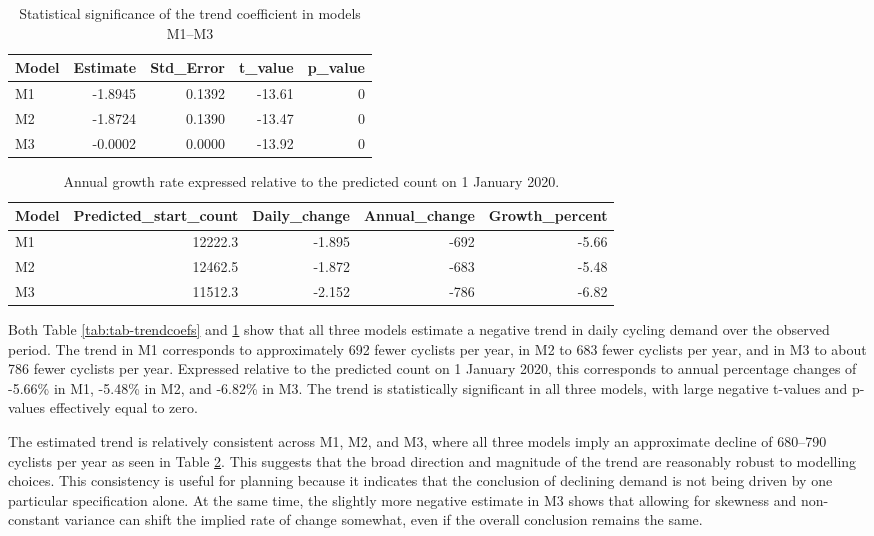 \documentclass[
]{article}
\begin{document}
\begin{table}[!h]
\centering
\caption{\label{tab:tab-trendsig}Statistical significance of the trend coefficient in models M1--M3}
\centering
\begin{tabular}[t]{lrrrr}
\toprule
Model & Estimate & Std\_Error & t\_value & p\_value\\
\midrule
M1 & -1.8945 & 0.1392 & -13.61 & 0\\
M2 & -1.8724 & 0.1390 & -13.47 & 0\\
M3 & -0.0002 & 0.0000 & -13.92 & 0\\
\bottomrule
\end{tabular}
\end{table}

\begin{table}[!h]
\centering
\caption{\label{tab:tab-growthrate}Annual growth rate expressed relative to the predicted count on 1 January 2020.}
\centering
\begin{tabular}[t]{lrrrr}
\toprule
Model & Predicted\_start\_count & Daily\_change & Annual\_change & Growth\_percent\\
\midrule
M1 & 12222.3 & -1.895 & -692 & -5.66\\
M2 & 12462.5 & -1.872 & -683 & -5.48\\
M3 & 11512.3 & -2.152 & -786 & -6.82\\
\bottomrule
\end{tabular}
\end{table}

Both Table \ref{tab:tab-trendcoefs} and \ref{tab:tab-trendsig} show that all three models estimate a negative trend in daily cycling demand over the observed period. The trend in M1 corresponds to approximately 692 fewer cyclists per year, in M2 to 683 fewer cyclists per year, and in M3 to about 786 fewer cyclists per year. Expressed relative to the predicted count on 1 January 2020, this corresponds to annual percentage changes of -5.66\% in M1, -5.48\% in M2, and -6.82\% in M3. The trend is statistically significant in all three models, with large negative t-values and p-values effectively equal to zero.

The estimated trend is relatively consistent across M1, M2, and M3, where all three models imply an approximate decline of 680--790 cyclists per year as seen in Table \ref{tab:tab-growthrate}. This suggests that the broad direction and magnitude of the trend are reasonably robust to modelling choices. This consistency is useful for planning because it indicates that the conclusion of declining demand is not being driven by one particular specification alone. At the same time, the slightly more negative estimate in M3 shows that allowing for skewness and non-constant variance can shift the implied rate of change somewhat, even if the overall conclusion remains the same.
\end{document}
